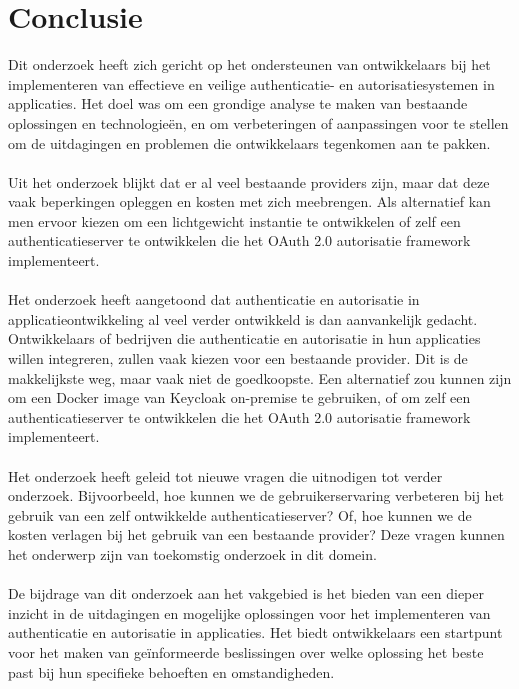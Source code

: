 
\chapter{Conclusie}%
\label{ch:conclusie}


Dit onderzoek heeft zich gericht op het ondersteunen van ontwikkelaars bij het implementeren van effectieve en veilige authenticatie- en autorisatiesystemen 
in applicaties. Het doel was om een grondige analyse te maken van bestaande oplossingen en technologieën, en om verbeteringen of aanpassingen 
voor te stellen om de uitdagingen en problemen die ontwikkelaars tegenkomen aan te pakken. 
\\\\
Uit het onderzoek blijkt dat er al veel bestaande providers zijn, maar dat deze vaak beperkingen opleggen en kosten met zich meebrengen. Als alternatief
kan men ervoor kiezen om een lichtgewicht instantie te ontwikkelen of zelf een authenticatieserver te ontwikkelen die het OAuth 2.0 autorisatie framework
implementeert.
\\\\
Het onderzoek heeft aangetoond dat authenticatie en autorisatie in applicatieontwikkeling al veel verder ontwikkeld is dan aanvankelijk gedacht.
Ontwikkelaars of bedrijven die authenticatie en autorisatie in hun applicaties willen integreren, zullen vaak kiezen voor een bestaande provider.
Dit is de makkelijkste weg, maar vaak niet de goedkoopste. Een alternatief zou kunnen zijn om een Docker image van Keycloak on-premise te gebruiken,
of om zelf een authenticatieserver te ontwikkelen die het OAuth 2.0 autorisatie framework implementeert.
\\\\
Het onderzoek heeft geleid tot nieuwe vragen die uitnodigen tot verder onderzoek. Bijvoorbeeld, hoe kunnen we de gebruikerservaring verbeteren bij
het gebruik van een zelf ontwikkelde authenticatieserver? Of, hoe kunnen we de kosten verlagen bij het gebruik van een bestaande provider? Deze vragen
kunnen het onderwerp zijn van toekomstig onderzoek in dit domein.
\\\\
De bijdrage van dit onderzoek aan het vakgebied is het bieden van een dieper inzicht in de uitdagingen en mogelijke oplossingen voor het implementeren
van authenticatie en autorisatie in applicaties. Het biedt ontwikkelaars een startpunt voor het maken van geïnformeerde beslissingen over welke oplossing
het beste past bij hun specifieke behoeften en omstandigheden.
